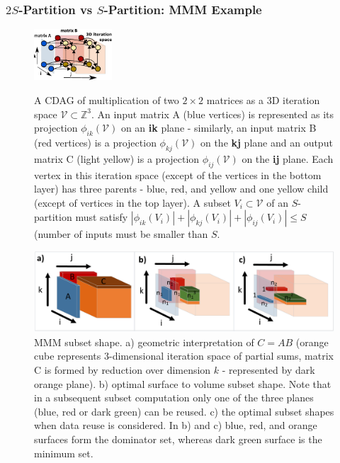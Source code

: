 \documentclass[sigplan,review,anonymous]{acmart}\settopmatter{printfolios=true,printccs=false,printacmref=false}
\begin{document}
\subsubsection{$2S$-Partition vs $S$-Partition: MMM Example}
\label{sec:mmmExample}
\begin{figure}
  \includegraphics[width=0.26\textwidth]{figures/iterationSpace}
  \label{fig:iterationSpace}
  \caption{A  CDAG of multiplication of two $2 \times 2$ matrices as a 3D 
  iteration 
  space $\mathcal{V} \subset \mathbb{Z}^3$. An input matrix A (blue vertices) 
  is represented as 
  its projection $\phi_{ik}(\mathcal{V})$
  on 
  an \textbf{ik} plane - similarly, an input matrix B (red vertices) is a 
  projection $\phi_{kj}(\mathcal{V})$ on the \textbf{kj} plane and an output 
  matrix C (light yellow) 
  is a 
  projection $\phi_{ij}(\mathcal{V})$ on the \textbf{ij} plane. Each vertex 
  in this iteration space 
  (except of the vertices in the bottom layer) has three parents - blue, red, 
  and yellow and one yellow child (except of vertices in the top layer). A  
  subset $V_i \subset \mathcal{V}$ of an $S$-partition must satisfy 
  $|\phi_{ik}(V_i)| 
  + |\phi_{kj}(V_i)| + |\phi_{ij}(V_i)| \le S$ (number of inputs must be 
  smaller than $S$.}
\end{figure}
 \begin{figure}
  \includegraphics[width=\columnwidth]{figures/mmm_reuse}
  \caption{MMM subset shape. a) 
    geometric interpretation of $C = A B$ (orange cube represents 
    3-dimensional iteration space of partial sums, matrix C is formed by 
    reduction over dimension $k$ - represented by dark orange plane). b) 
    optimal surface to volume subset shape. Note that in a subsequent 
    subset computation only one of the three planes (blue, red or dark 
    green) can be reused. c) the optimal subset shapes when 
    data reuse is considered. In b) and c) blue, red, and orange surfaces 
    form the dominator set, whereas dark green surface is the 
    minimum set.}
  \label{fig:mmmreuse}
\end{figure}
\end{document}
